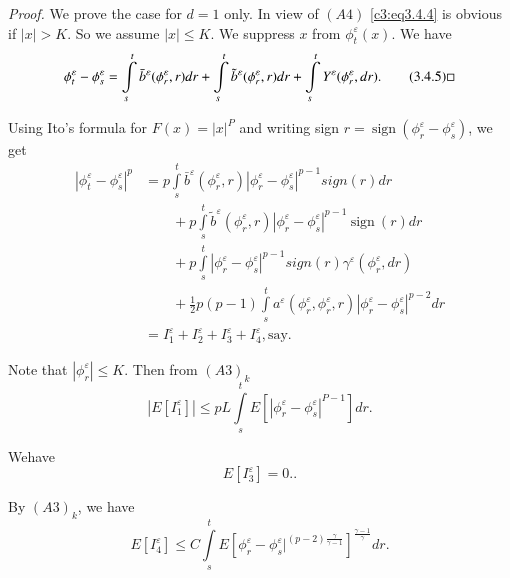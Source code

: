 \noindent \textit{Proof.}
  We prove the case for $d=1$ only. In view of $(A4)$ \eqref{c3:eq3.4.4} is
  obvious if $|x| >K$. So we assume $|x| \le K$. We suppress $x$ from
  $\phi^\varepsilon_t (x)$. We have 
  \begin{equation*}
    \phi^\varepsilon_t - \phi^\varepsilon_s= \int\limits_{s}^t
    \bar{b}^\varepsilon(\phi^\varepsilon_r,r) dr + \int\limits_{s}^t
    \tilde{b}^\varepsilon (\phi^\varepsilon_r,r) dr +
    \int\limits_{s}^t Y^\varepsilon (\phi^\varepsilon_r, dr).
    \tag{3.4.5}\label{c3:eq3.4.5}\hfill\Box  
  \end{equation*}  
 
  Using Ito's  formula for $F(x) = |x|^P$ and writing sign $r=
  ~\text{sign}~(\phi^\varepsilon_r- \phi^\varepsilon_s)$, we get  
\begin{align*}
  |\phi^\varepsilon_t-\phi^\varepsilon_s|^p & = p \int\limits_{s}^t
  \bar{b}^\varepsilon(\phi^\varepsilon_r,r)| \phi^\varepsilon_r-
  \phi^\varepsilon_s|^{p-1} sign(r) dr \\
  & \qquad + p \int\limits^t_s  \tilde{b}^\varepsilon (\phi^\varepsilon_r,r)|
  \phi^\varepsilon_r- \phi^\varepsilon_s|^{p-1} ~\text{sign}~(r) dr\\ 
  &\qquad + p \int\limits^t_s | \phi^\varepsilon_r- \phi^\varepsilon_s |^{p-1}
  sign(r) \gamma^\varepsilon ( \phi^\varepsilon_r, dr)\\ 
  & \qquad + \frac{1}{2} p(p-1) \int\limits^{t}_s a^\varepsilon (
  \phi^\varepsilon_r,\phi^\varepsilon_r,r)| \phi^\varepsilon_r
  -\phi^\varepsilon_s|^{p-2} dr\\ 
  & = I^\varepsilon_1 +I^\varepsilon_2 + I^\varepsilon_3
  +I^\varepsilon_4, \text{say}. \tag{3.4.6}\label{c3:eq3.4.6} 
\end{align*}
 
 Note that $|\phi^\varepsilon_r|\le K$. Then from  $(A3)_k$
 \begin{equation*}
   |E[I^\varepsilon_1 ]| \le pL \int\limits_{s}^t E
   [|\phi^\varepsilon_r-
\phi^\varepsilon_s|^{P-1} ] dr. \tag{3.4.7}\label{c3:eq3.4.7} 
 \end{equation*}
  
We\pageoriginale have 
\begin{equation*}
  E[I^{\varepsilon}_3] = 0. \tag{3.4.8}.\label{c3:eq3.4.8}
\end{equation*}

By $(A3)_k$, we have 
\begin{equation*}
  E[I^{\varepsilon}_4] \leq C \int \limits^t_s E[
    \phi^{\varepsilon}_r-\phi^{\varepsilon}_s|^{(p-2)
      \frac{\gamma}{\gamma-1}}] ^{\frac{\gamma-1}{\gamma}}
  dr. \tag{3.4.9}\label{c3:eq3.4.9} 
\end{equation*}

